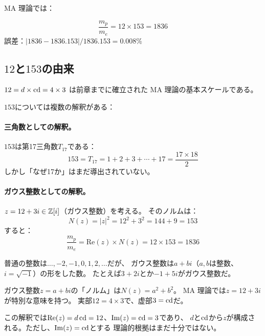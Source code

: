 MA 理論では：
\begin{keyresult}[陽子/電子質量比]
\begin{equation}
\frac{m_p}{m_e} = 12 \times 153 = 1836
\end{equation}
誤差：$|1836 - 1836.153| / 1836.153 = 0.008\%$
\end{keyresult}

\subsection{$12$と$153$の由来}

$12 = d \times \operatorname{cd} = 4 \times 3$ は前章までに確立された MA 理論の基本スケールである。

$153$については複数の解釈がある：

\paragraph{三角数としての解釈。}
$153$は第17三角数$T_{17}$である：
\begin{equation}
153 = T_{17} = 1 + 2 + 3 + \cdots + 17 = \frac{17 \times 18}{2}
\end{equation}
しかし「なぜ17か」はまだ導出されていない。

\paragraph{ガウス整数としての解釈。}
$z = 12 + 3i \in \mathbb{Z}[i]$（ガウス整数）を考える。
そのノルムは：
\begin{equation}
N(z) = |z|^2 = 12^2 + 3^2 = 144 + 9 = 153
\end{equation}
すると：
\begin{equation}
\frac{m_p}{m_e} = \mathrm{Re}(z) \times N(z) = 12 \times 153 = 1836
\end{equation}

\begin{hsbox}
普通の整数は$\ldots, -2, -1, 0, 1, 2, \ldots$だが、
ガウス整数は$a + bi$（$a,b$は整数、$i = \sqrt{-1}$）の形をした数。
たとえば$3 + 2i$とか$-1 + 5i$がガウス整数だ。

ガウス整数$z = a + bi$の「ノルム」は$N(z) = a^2 + b^2$。
MA 理論では$z = 12 + 3i$が特別な意味を持つ。
実部$12 = 4 \times 3$で、虚部$3 = \operatorname{cd}$だ。
\end{hsbox}

この解釈では$\mathrm{Re}(z) = d\operatorname{cd} = 12$、$\mathrm{Im}(z) = \operatorname{cd} = 3$であり、
$d$と$\operatorname{cd}$から$z$が構成される。ただし、$\mathrm{Im}(z) = \operatorname{cd}$とする
理論的根拠はまだ十分ではない。

